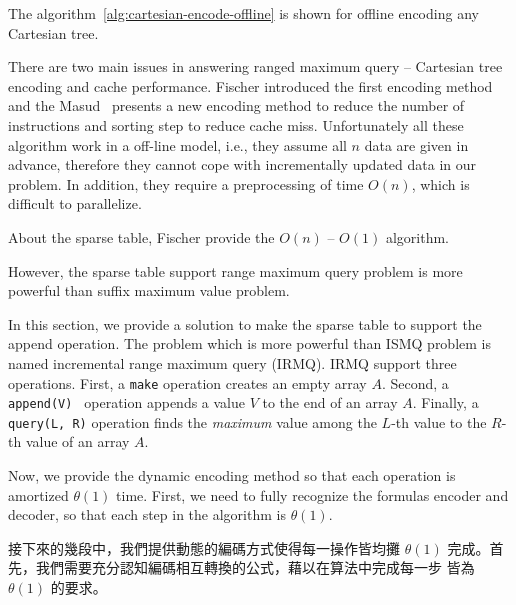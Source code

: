 The algorithm~\ref{alg:cartesian-encode-offline} is shown for offline
encoding any Cartesian tree.


There are two main issues in answering ranged maximum query --
Cartesian tree encoding and cache performance.  Fischer introduced the
first encoding method and the Masud~\cite{Hasan2010CacheOA} presents a
new encoding method to reduce the number of instructions and sorting
step to reduce cache miss.  Unfortunately all these algorithm work in
a off-line model, i.e., they assume all $n$ data are given in advance,
therefore they cannot cope with incrementally updated data in our
problem.  In addition, they require a preprocessing of time $O(n)$,
which is difficult to parallelize.

About the sparse table, Fischer provide the $O(n)$ -- $O(1)$
algorithm.

However, the sparse table support range maximum query problem is more
powerful than suffix maximum value problem.

In this section, we provide a solution to make the sparse table to
support the append operation. The problem which is more powerful than
ISMQ problem is named incremental range maximum query (IRMQ).  IRMQ
support three operations.  First, a {\tt make} operation creates an
empty array $A$.  Second, a {\tt append(V) } operation appends a value
$V$ to the end of an array $A$.  Finally, a {\tt query(L, R)}
operation finds the {\em maximum} value among the $L$-th value to the
$R$-th value of an array $A$.

\iffalse

ISMQ 已知解法有二，其一使用並查集在 $O(\alpha(n))$ 解決單一操作，其二
使用樸素的稀疏表在 $O(\log n)$完成插入操作、$O(1)$ 完成詢問操作。其二，
Fischer \cite{fischer} 提出的 $\theta(n)$ -- $\theta(1)$ 無法應用在此，
其原因在於插入元素時，無法動態決定 in-block 的最大值，必須等到整個
in-block 塞滿至預設值才可解決。

在我們的應用中維護後綴最大值，
拓展其操作成為增長區間最大值查找 (\emph{incremental range maximum query}, IRMQ)，
其支援兩項操作：
\fi

Now, we provide the dynamic encoding method so that each operation is
amortized $\theta(1)$ time.  First, we need to fully recognize the
formulas encoder and decoder, so that each step in the algorithm is
$\theta(1)$.


\iffalse

接下來的幾段中，我們提供動態的編碼方式使得每一操作皆均攤 $\theta(1)$
完成。首先，我們需要充分認知編碼相互轉換的公式，藉以在算法中完成每一步
皆為 $\theta(1)$ 的要求。

